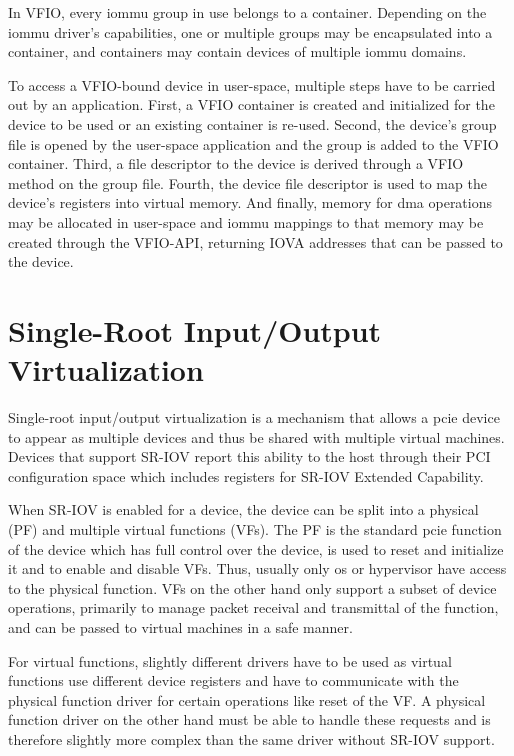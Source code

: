 In VFIO, every \ac{iommu} group in use belongs to a container. Depending on the
\ac{iommu} driver's capabilities, one or multiple groups may be encapsulated
into a container, and containers may contain devices of multiple \ac{iommu}
domains.

To access a VFIO-bound device in user-space, multiple steps have to be carried
out by an application. First, a VFIO container is created and initialized for
the device to be used or an existing container is re-used. Second, the device's
group file is opened by the user-space application and the group is added to the
VFIO container. Third, a file descriptor to the device is derived through a VFIO
method on the group file. Fourth, the device file descriptor is used to map the
device's registers into virtual memory. And finally, memory for \ac{dma}
operations may be allocated in user-space and \ac{iommu} mappings to that memory
may be created through the VFIO-API, returning IOVA addresses that can be passed
to the device.


\section{Single-Root Input/Output Virtualization}
\label{sec:sriov}

Single-root input/output virtualization is a mechanism that allows a \ac{pcie}
device to appear as multiple devices and thus be shared with multiple virtual
machines. Devices that support SR-IOV report this ability to the host through
their PCI configuration space which includes registers for SR-IOV Extended
Capability.

When SR-IOV is enabled for a device, the device can be split into a physical
(PF) and multiple virtual functions (VFs). The PF is the standard \ac{pcie}
function of the device which has full control over the device, is used to reset
and initialize it and to enable and disable VFs. Thus, usually only \ac{os} or
hypervisor have access to the physical function. VFs on the other hand only
support a subset of device operations, primarily to manage packet receival and
transmittal of the function, and can be passed to virtual machines in a safe
manner.

For virtual functions, slightly different drivers have to be used as virtual
functions use different device registers and have to communicate with the
physical function driver for certain operations like reset of the VF. A physical
function driver on the other hand must be able to handle these requests and is
therefore slightly more complex than the same driver without SR-IOV support.

